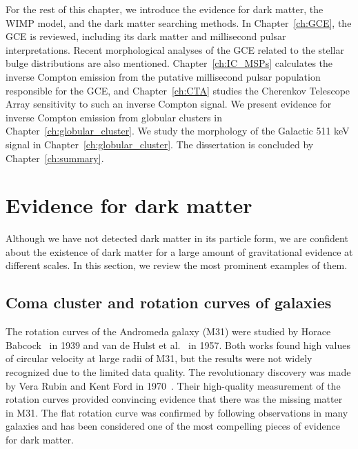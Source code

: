 \documentclass[doublespace,nopageskip]{VTthesis} %
\begin{document}
For the rest of this chapter, we introduce the evidence for dark matter, the WIMP model, and the dark matter searching methods. In Chapter~\ref{ch:GCE}, the GCE is reviewed, including its dark matter and millisecond pulsar interpretations. Recent morphological analyses of the GCE related to the stellar bulge distributions are also mentioned. Chapter~\ref{ch:IC_MSPs} calculates the inverse Compton emission from the putative millisecond pulsar population responsible for the GCE, and Chapter~\ref{ch:CTA} studies the Cherenkov Telescope Array sensitivity to such an inverse Compton signal. We present evidence for inverse Compton emission from globular clusters in Chapter~\ref{ch:globular_cluster}. We study the morphology of the Galactic 511 keV signal in Chapter~\ref{ch:globular_cluster}. The dissertation is concluded by Chapter~\ref{ch:summary}.

\section{Evidence for dark matter} \label{se:one_section}

Although we have not detected dark matter in its particle form, we are confident about the existence of dark matter for a large amount of gravitational evidence at different scales. In this section, we review the most prominent examples of them.

\subsection{Coma cluster and rotation curves of galaxies} \label{sse:rotation_curve}

The rotation curves of the Andromeda galaxy (M31) were studied by Horace Babcock~\cite{1939LicOB..19....1B} in 1939 and van de Hulst et al.~\cite{1957BAN....14....1V} in 1957. Both works found high values of circular velocity at large radii of M31, but the results were not widely recognized due to the limited data quality. The revolutionary discovery was made by Vera Rubin and Kent Ford in 1970~\cite{1970ApJ...159..379R}. Their high-quality measurement of the rotation curves provided convincing evidence that there was the missing matter in M31. The flat rotation curve was confirmed by following observations in many galaxies and has been considered one of the most compelling pieces of evidence for dark matter.
\end{document}
